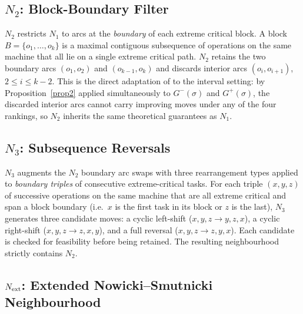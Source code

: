 \documentclass[preprint,12pt]{elsarticle}
\begin{document}
\subsection{$N_2$: Block-Boundary Filter}
\label{sec:N2}

$N_2$ restricts $N_1$ to arcs at the \emph{boundary} of each extreme critical block. A block $B = \{o_1,\ldots,o_k\}$ is a maximal contiguous subsequence of operations on the same machine that all lie on a single extreme critical path. $N_2$ retains the two boundary arcs $(o_1,o_2)$ and $(o_{k-1},o_k)$ and discards interior arcs $(o_i,o_{i+1})$, $2 \leq i \leq k-2$. This is the direct adaptation of \cite{Nowicki1996} to the interval setting: by Proposition~\ref{prop2} applied simultaneously to $G^-(\sigma)$ and $G^+(\sigma)$, the discarded interior arcs cannot carry improving moves under any of the four rankings, so $N_2$ inherits the same theoretical guarantees as $N_1$.

\subsection{$N_3$: Subsequence Reversals}
\label{sec:N3}

$N_3$ augments the $N_2$ boundary arc swaps with three rearrangement types applied to \emph{boundary triples} of consecutive extreme-critical tasks. For each triple $(x, y, z)$ of successive operations on the same machine that are all extreme critical and span a block boundary (i.e.\ $x$ is the first task in its block or $z$ is the last), $N_3$ generates three candidate moves: a cyclic left-shift ($x,y,z\to y,z,x$), a cyclic right-shift ($x,y,z\to z,x,y$), and a full reversal ($x,y,z\to z,y,x$). Each candidate is checked for feasibility before being retained. The resulting neighbourhood strictly contains $N_2$.

\subsection{$N_{\rm ext}$: Extended Nowicki--Smutnicki Neighbourhood}
\label{sec:Next}
\end{document}

